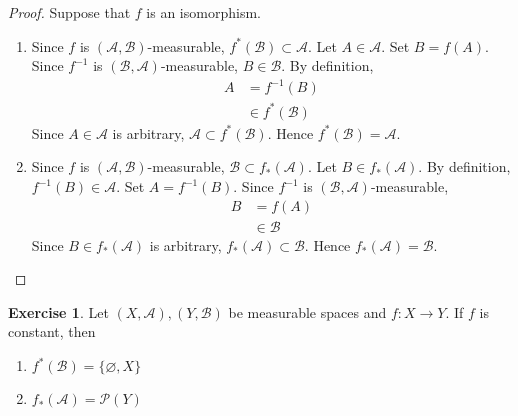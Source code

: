 \documentclass[12pt]{amsart}
\theoremstyle{definition}
\newtheorem{ex}[definition]{Exercise}
\newcommand{\MA}{\mathcal{A}}
\newcommand{\MB}{\mathcal{B}}
\newcommand{\MP}{\mathcal{P}}
\begin{document}
	\begin{proof} Suppose that $f$ is an isomorphism.
		\begin{enumerate}
			\item Since $f$ is $(\MA, \MB)$-measurable, $f^*(\MB) \subset \MA$. Let $A \in \MA$. Set $B = f(A)$. Since $f^{-1}$ is $(\MB, \MA)$-measurable, $B \in \MB$. By definition, 
			\begin{align*}
				A 
				& = f^{-1}(B) \\
				& \in f^*(\MB)  
			\end{align*}
			Since $A \in \MA$ is arbitrary, $\MA \subset f^*(\MB)$. Hence $f^*(\MB) = \MA$.
			\item Since $f$ is $(\MA, \MB)$-measurable, $\MB \subset f_*(\MA)$. Let $B \in f_*(\MA)$. By definition, $f^{-1}(B) \in \MA$. Set $A = f^{-1}(B)$.  Since $f^{-1}$ is $(\MB, \MA)$-measurable, 
			\begin{align*}
				B
				& = f(A) \\
				& \in \MB
			\end{align*}
			Since $B \in f_*(\MA)$ is arbitrary, $f_*(\MA) \subset \MB$. Hence $f_*(\MA) = \MB$.
		\end{enumerate}
	\end{proof}

	\begin{ex}
		Let $(X,\MA), (Y,\MB)$ be measurable spaces and $f: X \rightarrow Y$. If $f$ is constant, then 
		\begin{enumerate}
			\item $f^*(\MB) = \{\varnothing, X\}$
			\item $f_*(\MA) = \MP(Y)$
		\end{enumerate}
	\end{ex}
\end{document}
